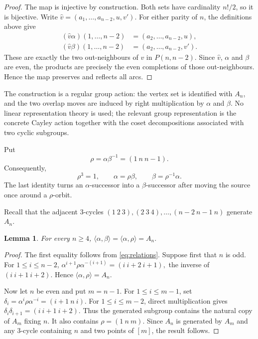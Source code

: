 \documentclass[4pt]{article} %
\newtheorem{lemma}[theorem]{Lemma}
\newcommand{\la}{\langle}
\newcommand{\ra}{\rangle}
\begin{document}
\begin{proof}
The map is injective by construction. Both sets have cardinality $n!/2$, so
it is bijective. Write
$
 \widehat v=(a_1,\ldots,a_{n-2},u,v').
$
For either parity of $n$, the definitions above give
\[
\begin{aligned}
 (\widehat v\alpha)(1,\ldots,n-2)
   &=(a_2,\ldots,a_{n-2},u),\\
 (\widehat v\beta)(1,\ldots,n-2)
   &=(a_2,\ldots,a_{n-2},v').
\end{aligned}
\]
These are exactly the two out-neighbours of $v$ in $P(n,n-2)$. Since
$\widehat v$, $\alpha$ and $\beta$ are even, the products are precisely the
even completions of those out-neighbours. Hence the map preserves and
reflects all arcs.
\end{proof}

The construction is a regular group action: the vertex set is identified
with $A_n$, and the two overlap moves are induced by right multiplication by
$\alpha$ and $\beta$. No linear representation theory is used; the relevant
group representation is the concrete Cayley action together with the coset
decompositions associated with two cyclic subgroups.

Put
\begin{equation}\label{eq:rho}
 \rho=\alpha\beta^{-1}=(1\ n\ n-1).
\end{equation}
Consequently,
\begin{equation}\label{eq:relations}
 \rho^3=1,\qquad \alpha=\rho\beta,\qquad \beta=\rho^{-1}\alpha.
\end{equation}
The last identity turns an $\alpha$-successor into a $\beta$-successor after
moving the source once around a $\rho$-orbit.

Recall that the adjacent $3$-cycles
$
 (1\ 2\ 3),(2\ 3\ 4),\ldots,(n-2\ n-1\ n)
$
generate $A_n$.

\begin{lemma}\label{lem:generation}
For every $n\geq4$,
$
 \la\alpha,\beta\ra=\la\alpha,\rho\ra=A_n.
$
\end{lemma}

\begin{proof}
The first equality follows from \eqref{eq:relations}. Suppose first that $n$
is odd. For $1\leq i\leq n-2$,
$
 \alpha^{i+1}\rho\alpha^{-(i+1)}
   =(i\ i+2\ i+1),
$
the inverse of $(i\ i+1\ i+2)$. Hence $\la\alpha,\rho\ra=A_n$.

Now let $n$ be even and put $m=n-1$. For $1\leq i\leq m-1$, set
$
 \delta_i=\alpha^i\rho\alpha^{-i}=(i+1\ n\ i).
$
For $1\leq i\leq m-2$, direct multiplication gives
$
 \delta_i\delta_{i+1}=(i\ i+1\ i+2).
$
Thus the generated subgroup contains the natural copy of $A_m$ fixing $n$.
It also contains $\rho=(1\ n\ m)$. Since $A_n$ is generated by $A_m$ and
any $3$-cycle containing $n$ and two points of $[m]$, the result follows.
\end{proof}
\end{document}
